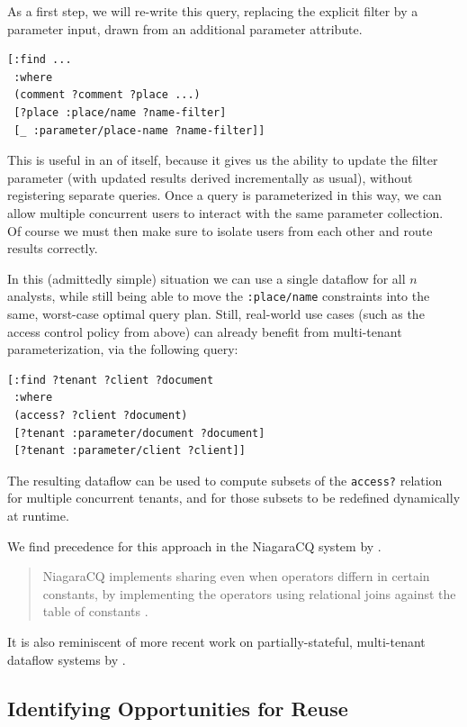 \documentclass[../catalog.tex]{subfiles}
\begin{document}
As a first step, we will re-write this query, replacing the explicit
filter by a parameter input, drawn from an additional parameter
attribute.

\begin{verbatim}
[:find ...
 :where
 (comment ?comment ?place ...)
 [?place :place/name ?name-filter]
 [_ :parameter/place-name ?name-filter]]
\end{verbatim}

This is useful in an of itself, because it gives us the ability to
update the filter parameter (with updated results derived
incrementally as usual), without registering separate queries. Once a
query is parameterized in this way, we can allow multiple concurrent
users to interact with the same parameter collection. Of course we
must then make sure to isolate users from each other and route results
correctly.

In this (admittedly simple) situation we can use a single dataflow for
all $n$ analysts, while still being able to move the
\texttt{:place/name} constraints into the same, worst-case optimal
query plan. Still, real-world use cases (such as the access control
policy from above) can already benefit from multi-tenant
parameterization, via the following query:

\begin{verbatim}
[:find ?tenant ?client ?document
 :where
 (access? ?client ?document)
 [?tenant :parameter/document ?document]
 [?tenant :parameter/client ?client]]
\end{verbatim}

The resulting dataflow can be used to compute subsets of the
\texttt{access?} relation for multiple concurrent tenants, and for
those subsets to be redefined dynamically at runtime.

We find precedence for this approach in the NiagaraCQ system by
\cite{chen2000niagaracq}.

\begin{quote}
NiagaraCQ implements sharing even when operators differn in certain
constants, by implementing the operators using relational joins
against the table of constants \cite{chen2000niagaracq}.

\cite{hirzel2014catalog}
\end{quote}

It is also reminiscent of more recent work on partially-stateful,
multi-tenant dataflow systems by \cite{gjengset2018noria}.

\subsection{Identifying Opportunities for Reuse}
\end{document}
